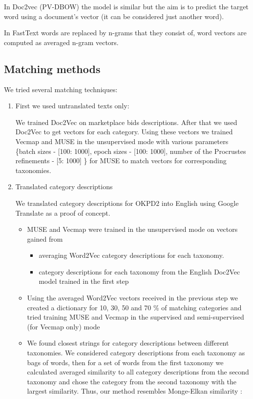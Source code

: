 \documentclass[conference]{IEEEtran}
\begin{document}
In Doc2vec (PV-DBOW) the model is similar but the aim is to predict the target word using a document's vector (it can be considered just another word).

In FastText words are replaced by n-grams that they consist of, word vectors are computed as averaged n-gram vectors.

\subsection{Matching methods}

We tried several matching techniques:
\begin{enumerate}
\item First we used untranslated texts only:

We trained Doc2Vec on marketplace bids descriptions. After that we used Doc2Vec to get vectors for each category. Using these vectors we trained Vecmap and MUSE in the unsupervised mode with various parameters \{batch sizes - [100: 1000], epoch sizes - [100: 1000], number of the Procrustes refinements - [5: 1000] \} for MUSE to match vectors for corresponding taxonomies.

\item Translated category descriptions

We translated category descriptions for OKPD2 into English using Google Translate as a proof of concept.
\begin{itemize}
\item MUSE and Vecmap were trained in the unsupervised mode on vectors gained from \begin{itemize}
    \item averaging Word2Vec category descriptions for each taxonomy.
    \item category descriptions for each taxonomy from the English Doc2Vec model trained in the first step
    \end{itemize}
\item Using the averaged Word2Vec vectors received in the previous step we created a dictionary for 10, 30, 50 and 70 \% of matching categories and tried training MUSE and Vecmap in the supervised and semi-supervised (for Vecmap only) mode
\item We found closest strings for category descriptions between different taxonomies. We considered category descriptions from each taxonomy as bags of words, then for a set of words from the first taxonomy we calculated averaged similarity to all category descriptions from the second taxonomy and chose the category from the second taxonomy with the largest similarity. Thus, our method resembles Monge-Elkan similarity \cite[p.~111]{dupe-detect}:
\end{itemize}


\end{enumerate}
\end{document}
